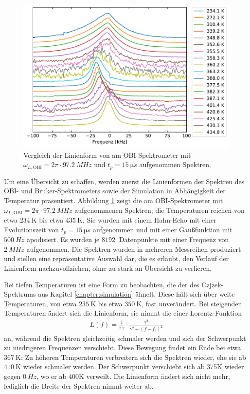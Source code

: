 \begin{figure}
	\begin{center}
		\includegraphics[width=\textwidth]{graphics/plot/spek_lineshape.pdf}
	\end{center}
	\caption{Vergleich der Linienform von am OBI-Spektrometer mit $\omega_{L, \text{OBI}} = 2\pi \cdot \SI{97.2}{MHz}$ und $t_p = \SI{15}{\micro s}$ aufgenommen Spektren.} \label{fig:res:spek_linienform}
\end{figure}
Um eine Übersicht zu schaffen, werden zuerst die Linienformen der Spektren des OBI- und Bruker-Spektrometers sowie der Simulation in Abhängigkeit der Temperatur präsentiert. Abbildung \ref{fig:res:spek_linienform} zeigt die am OBI-Spektrometer mit $\omega_{L, \text{OBI}} = 2\pi \cdot \SI{97.2}{MHz}$ aufgenommenen Spektren; die Temperaturen reichen von etwa $\SI{234}{\kelvin}$ bis etwa $\SI{435}{\kelvin}$. Sie wurden mit einem Hahn-Echo mit einer Evolutionszeit von $t_p = \SI{15}{\micro s}$ aufgenommen und mit einer Gaußfunktion mit $\SI{500}{Hz}$ apodisiert. Es wurden je $\SI{8192}{}$ Datenpunkte mit einer Frequenz von $\SI{2}{MHz}$ aufgenommen. Die Spektren wurden in mehreren Messreihen produziert und stellen eine repräsentative Auswahl dar, die es erlaubt, den Verlauf der Linienform nachzuvollziehen, ohne zu stark an Übersicht zu verlieren.

Bei tiefen Temperaturen ist eine Form zu beobachten, die der des Czjzek-Spektrums aus Kapitel \ref{chapter:simulation} ähnelt. Diese hält sich über weite Temperaturen, von etwa $\SI{235}{\kelvin}$ bis etwa $\SI{350}{\kelvin}$, fast unverändert. Bei steigenden Temperaturen ändert sich die Linienform, sie nimmt die einer Lorentz-Funktion
\begin{align}
	L(f) = \frac{1}{\pi \gamma} \cdot \frac{\gamma^2}{\gamma^2 + (f - f_0)^2} \label{eqn:res:lorentz}
\end{align}
an, während die Spektren gleichzeitig schmaler werden und sich der Schwerpunkt zu niedrigeren Frequenzen verschiebt. Diese Bewegung findet ein Ende bei etwa $\SI{367}{\kelvin}$: Zu höheren Temperaturen verbreitern sich die Spektren wieder, ehe sie ab $\SI{410}{\kelvin}$ wieder schmaler werden. Der Schwerpunkt verschiebt sich ab 375K wieder gegen $\SI{0}{Hz}$, wo er ab 400K verweilt. Die Linienform ändert sich nicht mehr, lediglich die Breite der Spektren nimmt weiter ab.

